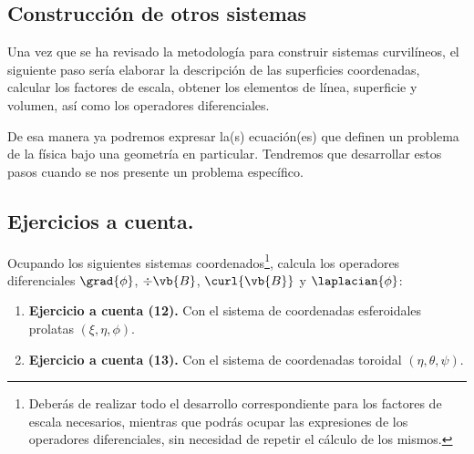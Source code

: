 \subsection{Construcción de otros sistemas}

Una vez que se ha revisado la metodología para construir sistemas curvilíneos, el siguiente paso sería elaborar la descripción de las superficies coordenadas, calcular los factores de escala, obtener los elementos de línea, superficie y volumen, así como los operadores diferenciales.
\par
De esa manera ya podremos expresar la(s) ecuación(es) que definen un problema de la física bajo una geometría en particular. Tendremos que desarrollar estos pasos cuando se nos presente un problema específico.

\subsection*{Ejercicios a cuenta.}
Ocupando los siguientes sistemas coordenados\footnote{Deberás de realizar todo el desarrollo correspondiente para los factores de escala necesarios, mientras que podrás ocupar las expresiones de los operadores diferenciales, sin necesidad de repetir el cálculo de los mismos.}, calcula los operadores diferenciales $\grad{\phi}$, $\div{\vb{B}}$, $\curl{\vb{B}}$ y $\laplacian{\phi}$:
\begin{enumerate}
\item \textbf{Ejercicio a cuenta (12). } Con el sistema de coordenadas esferoidales prolatas $(\xi, \eta, \phi)$.
\item \textbf{Ejercicio a cuenta (13). } Con el sistema de coordenadas toroidal $(\eta, \theta, \psi)$.
\end{enumerate}

